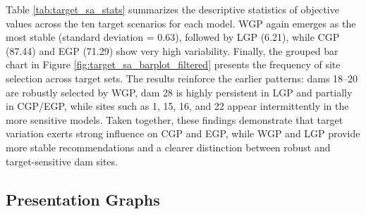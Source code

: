 Table \ref{tab:target_sa_stats} summarizes the descriptive statistics of objective values across the ten target scenarios for each model. WGP again emerges as the most stable (standard deviation = 0.63), followed by LGP (6.21), while CGP (87.44) and EGP (71.29) show very high variability. Finally, the grouped bar chart in Figure \ref{fig:target_sa_barplot_filtered} presents the frequency of site selection across target sets. The results reinforce the earlier patterns: dams 18–20 are robustly selected by WGP, dam 28 is highly persistent in LGP and partially in CGP/EGP, while sites such as 1, 15, 16, and 22 appear intermittently in the more sensitive models. Taken together, these findings demonstrate that target variation exerts strong influence on CGP and EGP, while WGP and LGP provide more stable recommendations and a clearer distinction between robust and target-sensitive dam sites.

        




\subsection{Presentation Graphs}








